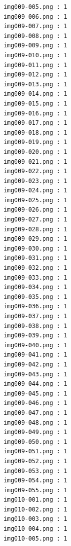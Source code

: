 \documentclass[12pt,a4paper]{article}
\begin{document}
\begin{lstlisting}
                     img009-005.png : 1
                     img009-006.png : 1
                     img009-007.png : 1
                     img009-008.png : 1
                     img009-009.png : 1
                     img009-010.png : 1
                     img009-011.png : 1
                     img009-012.png : 1
                     img009-013.png : 1
                     img009-014.png : 1
                     img009-015.png : 1
                     img009-016.png : 1
                     img009-017.png : 1
                     img009-018.png : 1
                     img009-019.png : 1
                     img009-020.png : 1
                     img009-021.png : 1
                     img009-022.png : 1
                     img009-023.png : 1
                     img009-024.png : 1
                     img009-025.png : 1
                     img009-026.png : 1
                     img009-027.png : 1
                     img009-028.png : 1
                     img009-029.png : 1
                     img009-030.png : 1
                     img009-031.png : 1
                     img009-032.png : 1
                     img009-033.png : 1
                     img009-034.png : 1
                     img009-035.png : 1
                     img009-036.png : 1
                     img009-037.png : 1
                     img009-038.png : 1
                     img009-039.png : 1
                     img009-040.png : 1
                     img009-041.png : 1
                     img009-042.png : 1
                     img009-043.png : 1
                     img009-044.png : 1
                     img009-045.png : 1
                     img009-046.png : 1
                     img009-047.png : 1
                     img009-048.png : 1
                     img009-049.png : 1
                     img009-050.png : 1
                     img009-051.png : 1
                     img009-052.png : 1
                     img009-053.png : 1
                     img009-054.png : 1
                     img009-055.png : 1
                     img010-001.png : 1
                     img010-002.png : 1
                     img010-003.png : 1
                     img010-004.png : 1
                     img010-005.png : 1




\end{lstlisting}
\end{document}
